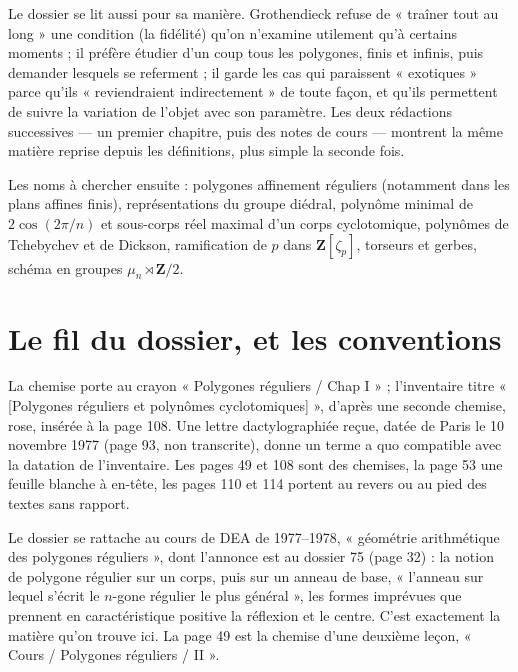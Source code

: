 \documentclass[11pt,a4paper]{article}
\begin{document}
\begin{resume}
Le dossier se lit aussi pour sa manière. Grothendieck refuse de « traîner tout
au long » une condition (la fidélité) qu'on n'examine utilement qu'à certains
moments ; il préfère étudier d'un coup tous les polygones, finis et infinis,
puis demander lesquels se referment ; il garde les cas qui paraissent
« exotiques » parce qu'ils « reviendraient indirectement » de toute façon, et
qu'ils permettent de suivre la variation de l'objet avec son paramètre. Les
deux rédactions successives --- un premier chapitre, puis des notes de cours
--- montrent la même matière reprise depuis les définitions, plus simple la
seconde fois.

Les noms à chercher ensuite : polygones affinement réguliers (notamment dans
les plans affines finis), représentations du groupe diédral, polynôme minimal
de $2\cos(2\pi/n)$ et sous-corps réel maximal d'un corps cyclotomique,
polynômes de Tchebychev et de Dickson, ramification de $p$ dans
$\mathbf{Z}[\zeta_p]$, torseurs et gerbes, schéma en groupes $\mu_n \rtimes
\mathbf{Z}/2$.

\end{resume}

\section*{Le fil du dossier, et les conventions}

La chemise porte au crayon « Polygones réguliers / Chap I » ; l'inventaire
titre « [Polygones réguliers et polynômes cyclotomiques] », d'après une
seconde chemise, rose, insérée à la page 108. Une lettre dactylographiée
reçue, datée de Paris le 10 novembre 1977 (page 93, non transcrite), donne un
terme a quo compatible avec la datation de l'inventaire. Les pages 49 et 108
sont des chemises, la page 53 une feuille blanche à en-tête, les pages 110
et 114 portent au revers ou au pied des textes sans rapport.

Le dossier se rattache au cours de DEA de 1977--1978, « géométrie arithmétique
des polygones réguliers », dont l'annonce est au dossier 75 (page 32) : la
notion de polygone régulier sur un corps, puis sur un anneau de base,
« l'anneau sur lequel s'écrit le $n$-gone régulier le plus général », les formes
imprévues que prennent en caractéristique positive la réflexion et le centre.
C'est exactement la matière qu'on trouve ici. La page 49 est la chemise d'une
deuxième leçon, « Cours / Polygones réguliers / II ».
\end{document}
